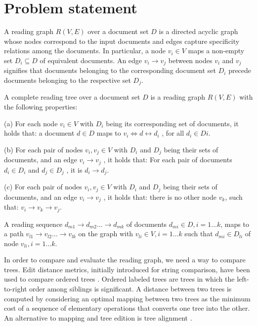 \documentclass[12pt,twoside]{article}
\begin{document}
	\section{Problem statement}
	A reading graph $R(V, E)$ over a document set $D$ is a directed acyclic graph whose nodes correspond to the input documents and edges capture specificity relations among the documents. In particular, a node $v_i \in V$ maps a non-empty set $D_i \subseteq D$ of equivalent documents. An edge $v_i \rightarrow v_j$ between nodes $v_i$ and $v_j$ signifies that documents belonging to the corresponding document set $D_i$ precede documents belonging to the respective set $D_j$.
	
	A complete reading tree over a document set $D$ is a reading graph $R(V, E)$ with the following properties:
	
	(a) For each node $v_i \in V$ with $D_i$ being its corresponding set of documents, it holds that: a document $d \in D$ maps to $v_i \Leftrightarrow d \leftrightarrow d_i$ , for all $d_i \in Di.$
	
	(b) For each pair of nodes $v_i, v_j \in V$ with $D_i$ and $D_j$ being their sets of documents, and an edge $v_i \rightarrow v_j$ , it holds that: For each pair of documents $d_i \in D_i$ and $d_j \in D_j$ , it is $d_i\rightarrow d_j.$
	
	(c) For each pair of nodes $v_i, v_j \in V$ with $D_i$ and $D_j$ being their sets of documents, and an edge $v_i\rightarrow v_j$ , it holds that: there is no other node $v_k$, such that: $v_i \rightarrow v_k \rightarrow v_j.$
	
	A reading sequence $d_{m1} \rightarrow d_{m2} \ldots \rightarrow d_{mk}$ of documents $d_{mi} \in D, i = 1 \ldots k$, maps to a path $v_{l1} \rightarrow v_{l2} \ldots \rightarrow v_{lk}$ on the graph with $v_{li} \in V, i = 1 \ldots k$ such that $d_{mi} \in D_{li}$ of node $v_{li}, i = 1 \ldots k.$
	
	In order to compare and evaluate the reading graph, we need a way to compare trees. Edit distance metrics, initially introduced for string comparison, have been used to compare ordered trees \cite{Tanaka88b}. Ordered labeled trees are trees in which the left-to-right order among siblings is significant. A distance between two trees is computed by considering an optimal mapping between two trees as the minimum cost of a sequence of elementary operations that converts one tree into the other. An alternative to mapping and tree edition is tree alignment \cite{JWZ94}. 
	
\end{document}
